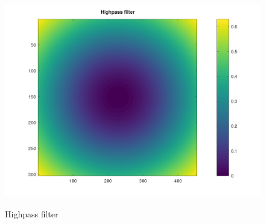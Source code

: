 \documentclass{article}
\begin{document}
\begin{figure}[H]
  \begin{center}
    \includegraphics[width=\textwidth]{./images/ex03_2.png}
    \label{ex03_highpass}
    \caption{Highpass filter}
  \end{center}
\end{figure}
\end{document}
